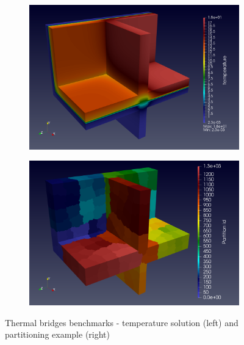 \begin{figure}[!ht]
  \centering
  \begin{subfigure}[c]{0.49\textwidth}
    \centering
    \includegraphics[width=\textwidth]{graphics/feelpp/feelpp-benchmark-thermalbridges-solution.png}
  \end{subfigure}
  \hfill
  \begin{subfigure}[c]{0.49\textwidth}
    \centering
    \includegraphics[width=\textwidth]{graphics/feelpp/feelpp-benchmark-thermalbridges-pid.png}
  \end{subfigure}
  \caption{Thermal bridges benchmarks - temperature solution (left) and
    partitioning example (right)}
  \label{fig:wp1:feelpp:thermal_bridges:visualization}
\end{figure}




